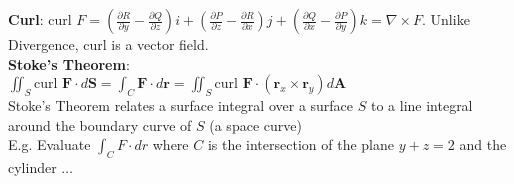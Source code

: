 \documentclass{article}
\begin{document}
{\begin{multicols*}{3}
\textbf{Curl}: $\text{curl }F=(\frac{\partial R}{\partial y}-\frac{\partial Q}{\partial z})i+(\frac{\partial P}{\partial z}-\frac{\partial R}{\partial x})j+(\frac{\partial Q}{\partial x}-\frac{\partial P}{\partial y})k=\nabla \times F$. Unlike Divergence, curl is a vector field. \\
\textbf{Stoke's Theorem}: \\
$\iint_S\text{curl }\mathbf{F}\cdot d\mathbf{S}=\int_C\mathbf{F}\cdot d\mathbf{r}=\iint_S\text{curl }\mathbf{F}\cdot(\mathbf{r}_x\times \mathbf{r}_y)d\mathbf{A}$\\
Stoke's Theorem relates a surface integral over a surface $S$ to a line integral around the boundary curve of $S$ (a space curve)\\
E.g. Evaluate $\int_CF\cdot dr$ where $C$ is the intersection of the plane $y+z=2$ and the cylinder $\dots$\\
\end{multicols*}
}
\end{document}
